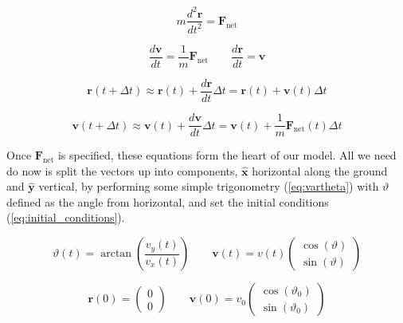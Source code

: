 \documentclass[notitlepage,aps,prd,nofootinbib]{revtex4-1}
\begin{document}
\begin{equation} \label{eq:newton2}
m \frac{d^{2} \mathbf{r}}{d t^{2}} = \mathbf{F}_{\text{net}} 
\end{equation}

\begin{equation} \label{eq:deqs}
\frac{d \mathbf{v}}{d t} = \frac{1}{m} \mathbf{F}_{\text{net}}
\qquad
\frac{d \mathbf{r}}{d t} = \mathbf{v}
\end{equation}

\begin{equation} \label{eq:r_euler}
\mathbf{r}\left(t + \Delta t\right) \approx \mathbf{r}\left(t\right) + \frac{d \mathbf{r}}{d t} \Delta t = \mathbf{r}\left(t\right) + \mathbf{v}\left(t\right) \Delta t
\end{equation}

\begin{equation} \label{eq:v_euler}
\mathbf{v}\left(t + \Delta t\right) \approx \mathbf{v}\left(t\right) + \frac{d \mathbf{v}}{d t} \Delta t = \mathbf{v}\left(t\right) + \frac{1}{m}\mathbf{F}_{\text{net}}\left(t\right) \Delta t
\end{equation}

Once $\mathbf{F}_{\text{net}}$ is specified, these equations form the heart of our model. All we need do now is split the vectors up into components, $\hat{\mathbf{x}}$ horizontal along the ground and $\hat{\mathbf{y}}$ vertical, by performing some simple trigonometry (\ref{eq:vartheta}) with $\vartheta$ defined as the angle from horizontal, and set the initial conditions (\ref{eq:initial_conditions}).

\begin{equation} \label{eq:vartheta}
\vartheta\left(t\right) = \arctan\left(\frac{v_{y}(t)}{v_{x}(t)}\right)
\qquad
\mathbf{v}\left(t\right) = v\left(t\right)
\begin{pmatrix}
  \cos(\vartheta) \\
  \sin(\vartheta)
\end{pmatrix}
\end{equation}

\begin{equation} \label{eq:initial_conditions}
\mathbf{r}\left(0\right) = 
\begin{pmatrix}
  0 \\
  0
\end{pmatrix}
\qquad
\mathbf{v}\left(0\right) = v_{0}
\begin{pmatrix}
  \cos(\vartheta_{0}) \\
  \sin(\vartheta_{0})
\end{pmatrix}
\end{equation}
\end{document}
